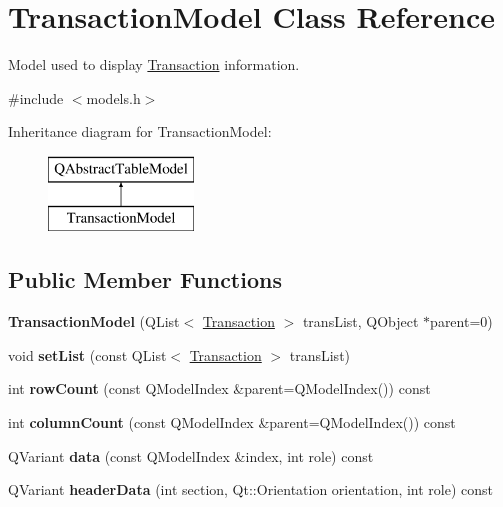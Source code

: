 \hypertarget{class_transaction_model}{}\section{Transaction\+Model Class Reference}
\label{class_transaction_model}


Model used to display \mbox{\hyperlink{class_transaction}{Transaction}} information.  




{\ttfamily \#include $<$models.\+h$>$}

Inheritance diagram for Transaction\+Model\+:\begin{figure}[H]
\begin{center}
\leavevmode
\includegraphics[height=2.000000cm]{class_transaction_model}
\end{center}
\end{figure}
\subsection*{Public Member Functions}
\begin{DoxyCompactItemize}
\item 
\mbox{\label{class_transaction_model_af487a4b3e1635e4724bfa2fe8f5c556a}} 
{\bfseries Transaction\+Model} (Q\+List$<$ \mbox{\hyperlink{class_transaction}{Transaction}} $>$ trans\+List, Q\+Object $\ast$parent=0)
\item 
\mbox{\label{class_transaction_model_a1b41fb6cb6fb0bcc8ff2ea902a12023d}} 
void {\bfseries set\+List} (const Q\+List$<$ \mbox{\hyperlink{class_transaction}{Transaction}} $>$ trans\+List)
\item 
\mbox{\label{class_transaction_model_a11b9d963b530b93841697684bfea0707}} 
int {\bfseries row\+Count} (const Q\+Model\+Index \&parent=Q\+Model\+Index()) const
\item 
\mbox{\label{class_transaction_model_a725a8e450398ecac662b67f51fa6cc5e}} 
int {\bfseries column\+Count} (const Q\+Model\+Index \&parent=Q\+Model\+Index()) const
\item 
\mbox{\label{class_transaction_model_a617307df3d516694d04e04d3929aeb1d}} 
Q\+Variant {\bfseries data} (const Q\+Model\+Index \&index, int role) const
\item 
\mbox{\label{class_transaction_model_a2b5ed7bad5248a8d49b970268bfcfb00}} 
Q\+Variant {\bfseries header\+Data} (int section, Qt\+::\+Orientation orientation, int role) const
\end{DoxyCompactItemize}
